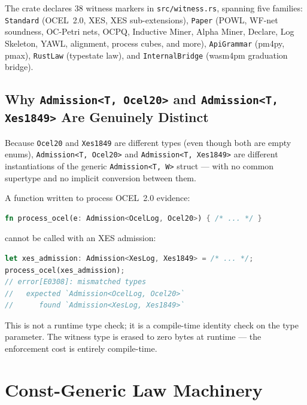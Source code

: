 The crate declares 38 witness markers in \texttt{src/witness.rs}, spanning
five families: \texttt{Standard} (OCEL~2.0, XES, XES sub-extensions),
\texttt{Paper} (POWL, WF-net soundness, OC-Petri nets, OCPQ, Inductive Miner,
Alpha Miner, Declare, Log Skeleton, YAWL, alignment, process cubes, and more),
\texttt{ApiGrammar} (pm4py, pmax), \texttt{RustLaw} (typestate law), and
\texttt{InternalBridge} (wasm4pm graduation bridge).

\subsection{Why \texttt{Admission<T, Ocel20>} and \texttt{Admission<T, Xes1849>} Are Genuinely Distinct}

Because \texttt{Ocel20} and \texttt{Xes1849} are different types (even though
both are empty enums), \texttt{Admission<T, Ocel20>} and
\texttt{Admission<T, Xes1849>} are different instantiations of the generic
\texttt{Admission<T, W>} struct --- with no common supertype and no implicit
conversion between them.

A function written to process OCEL~2.0 evidence:

\begin{lstlisting}[language=Rust, label={lst:witness-distinct}]
fn process_ocel(e: Admission<OcelLog, Ocel20>) { /* ... */ }
\end{lstlisting}

\noindent cannot be called with an XES admission:

\begin{lstlisting}[language=Rust]
let xes_admission: Admission<XesLog, Xes1849> = /* ... */;
process_ocel(xes_admission);
// error[E0308]: mismatched types
//   expected `Admission<OcelLog, Ocel20>`
//      found `Admission<XesLog, Xes1849>`
\end{lstlisting}

This is not a runtime type check; it is a compile-time identity check on the
type parameter. The witness type is erased to zero bytes at runtime --- the
enforcement cost is entirely compile-time.

\section{Const-Generic Law Machinery}
\label{sec:arch-constlaw}


